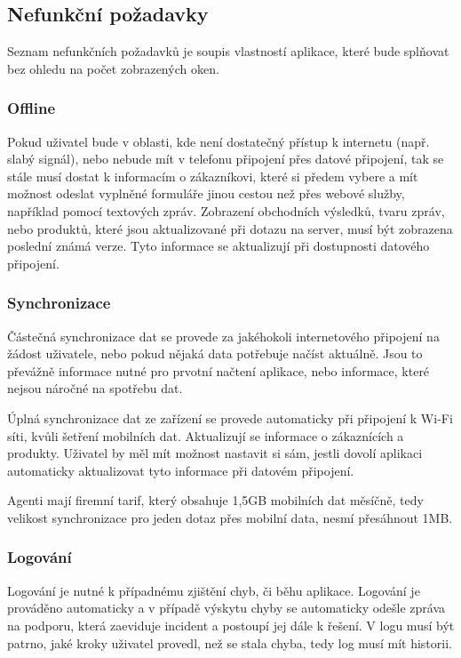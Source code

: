\documentclass[11pt,twoside,a4paper]{book}
\begin{document}
\subsection{Nefunkční požadavky}
Seznam nefunkčních požadavků je soupis vlastností aplikace, které bude splňovat bez ohledu na počet zobrazených oken.

\subsubsection{Offline}
Pokud uživatel bude v oblasti, kde není dostatečný přístup k internetu (např. slabý signál), nebo nebude mít v telefonu připojení přes datové připojení, tak se stále musí dostat k informacím o zákazníkovi, které si předem vybere a mít možnost odeslat vyplněné formuláře jinou cestou než přes webové služby, například pomocí textových zpráv. Zobrazení obchodních výsledků, tvaru zpráv, nebo produktů, které jsou aktualizované při dotazu na server, musí být zobrazena poslední známá verze. Tyto informace se aktualizují při dostupnosti datového připojení.

\subsubsection{Synchronizace}
Částečná synchronizace dat se provede za jakéhokoli internetového připojení na žádost uživatele, nebo pokud nějaká data potřebuje načíst aktuálně. Jsou to převážně informace nutné pro prvotní načtení aplikace, nebo informace, které nejsou náročné na spotřebu dat.

Úplná synchronizace dat ze zařízení se provede automaticky při připojení k Wi-Fi síti, kvůli šetření mobilních dat. Aktualizují se informace o zákaznících a produkty. Uživatel by měl mít možnost nastavit si sám, jestli dovolí aplikaci automaticky aktualizovat tyto informace při datovém připojení.

Agenti mají firemní tarif, který obsahuje 1,5GB mobilních dat měsíčně, tedy velikost synchronizace pro jeden dotaz přes mobilní data, nesmí přesáhnout 1MB.

\subsubsection{Logování}
Logování je nutné k případnému zjištění chyb, či běhu aplikace. Logování je prováděno automaticky a v případě výskytu chyby se automaticky odešle zpráva na podporu, která zaeviduje incident a postoupí jej dále k řešení. V logu musí být patrno, jaké kroky uživatel provedl, než se stala chyba, tedy log musí mít historii.
\end{document}
